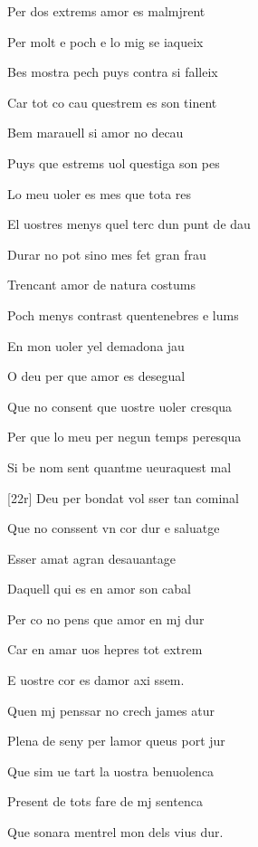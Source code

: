 \documentclass[12pt]{article}
\begin{document}
\begin{estrofa}

 Per dos extrems amor es malmjrent

 Per molt e poch e lo mig se iaqueix

 Bes mostra pech puys contra si falleix

 Car tot co cau questrem es son tinent

 Bem marauell si amor no decau

 Puys que estrems uol questiga son pes

 Lo meu uoler es mes que tota res

 El uostres menys quel terc dun punt de dau

\end{estrofa}



\begin{estrofa}

 Durar no pot sino mes fet gran frau

 Trencant amor de natura costums

 Poch menys contrast quentenebres e lums

 En mon uoler yel demadona jau

 O deu per que amor es desegual

 Que no consent que uostre uoler cresqua

 Per que lo meu per negun temps peresqua

 Si be nom sent quantme ueuraquest mal

\end{estrofa}



\begin{estrofa}

 [22r] Deu per bondat vol sser tan cominal

 Que no conssent vn cor dur e saluatge

 Esser amat agran desauantage

 Daquell qui es en amor son cabal

 Per co no pens que amor en mj dur

 Car en amar uos hepres tot extrem

 E uostre cor es damor axi ssem.

 Quen mj penssar no crech james atur

\end{estrofa}



\begin{estrofa}

 Plena de seny per lamor queus port jur

 Que sim ue tart la uostra benuolenca

 Present de tots fare de mj sentenca

 Que sonara mentrel mon dels vius dur.

\end{estrofa}
\end{document}
